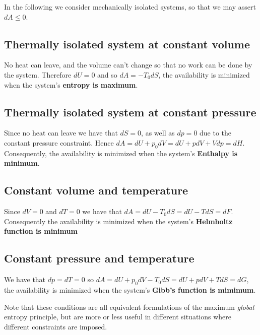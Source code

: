 \documentclass[a4paper,11pt,oneside]{book}
\begin{document}
In the following we consider mechanically isolated systems, so that we may assert $dA\leq 0$. 


\subsection*{Thermally isolated system at constant volume}
No heat can leave, and the volume can't change so that no work can be done by the system. Therefore $dU = 0$ and so $dA = -T_0 dS$, the availability is minimized when the system's \textbf{entropy is maximum}.

\subsection*{Thermally isolated system at constant pressure}
Since no heat can leave we have that $dS = 0$, as well as $dp=0$ due to the constant pressure constraint. Hence $dA = dU + p_0dV=dU + pdV + Vdp = dH$. Consequently, the availability is minimized when the system's \textbf{Enthalpy is minimum}. 

\subsection*{Constant volume and temperature}
Since $dV = 0$ and $dT = 0$ we have that $dA = dU -T_0dS= dU - TdS = dF$. Consequently the availability is minimized when the system's \textbf{Helmholtz function is minimum}

\subsection{Constant pressure and temperature}
We have that $dp=dT=0$ so  $dA = dU+p_0dV- T_0 dS = dU + pdV + TdS=dG$, the availability is minimized when the system's \textbf{Gibb's function is mimimum}.

Note that these conditions are all equivalent formulations of the maximum \textit{global} entropy principle, but are more or less useful in different situations where different constraints are imposed.
\end{document}

